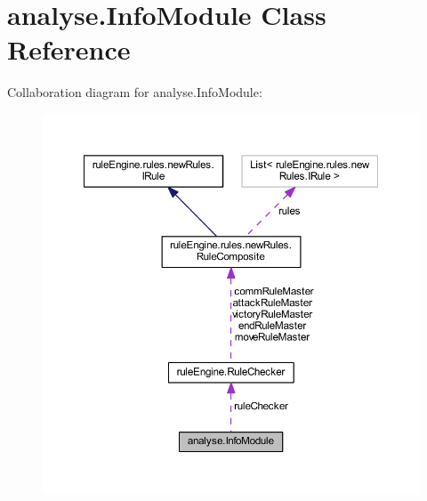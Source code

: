 \hypertarget{classanalyse_1_1_info_module}{}\section{analyse.\+Info\+Module Class Reference}
\label{classanalyse_1_1_info_module}


Collaboration diagram for analyse.\+Info\+Module\+:
\nopagebreak
\begin{figure}[H]
\begin{center}
\leavevmode
\includegraphics[width=350pt]{classanalyse_1_1_info_module__coll__graph}
\end{center}
\end{figure}
